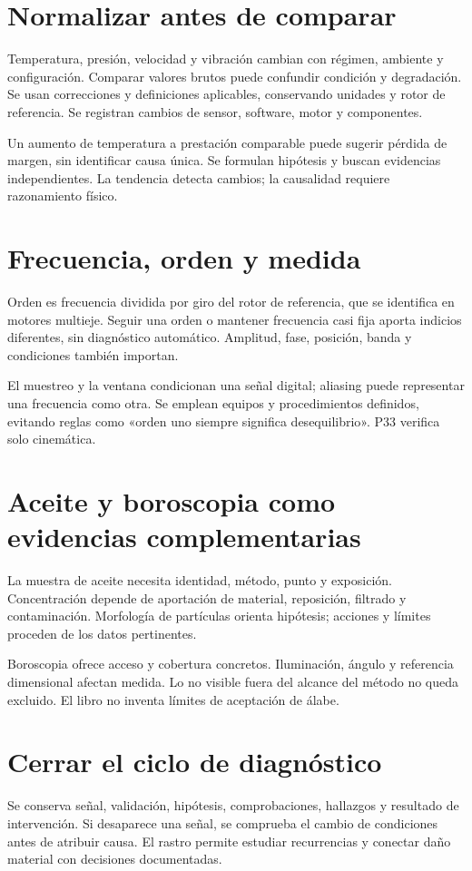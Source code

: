 
\section{Normalizar antes de comparar}
Temperatura, presión, velocidad y vibración cambian con régimen, ambiente y configuración. Comparar valores brutos puede confundir condición y degradación. Se usan correcciones y definiciones aplicables, conservando unidades y rotor de referencia. Se registran cambios de sensor, software, motor y componentes.

Un aumento de temperatura a prestación comparable puede sugerir pérdida de margen, sin identificar causa única. Se formulan hipótesis y buscan evidencias independientes. La tendencia detecta cambios; la causalidad requiere razonamiento físico.
\section{Frecuencia, orden y medida}
Orden es frecuencia dividida por giro del rotor de referencia, que se identifica en motores multieje. Seguir una orden o mantener frecuencia casi fija aporta indicios diferentes, sin diagnóstico automático. Amplitud, fase, posición, banda y condiciones también importan.

El muestreo y la ventana condicionan una señal digital; aliasing puede representar una frecuencia como otra. Se emplean equipos y procedimientos definidos, evitando reglas como «orden uno siempre significa desequilibrio». P33 verifica solo cinemática.
\section{Aceite y boroscopia como evidencias complementarias}
La muestra de aceite necesita identidad, método, punto y exposición. Concentración depende de aportación de material, reposición, filtrado y contaminación. Morfología de partículas orienta hipótesis; acciones y límites proceden de los datos pertinentes.

Boroscopia ofrece acceso y cobertura concretos. Iluminación, ángulo y referencia dimensional afectan medida. Lo no visible fuera del alcance del método no queda excluido. El libro no inventa límites de aceptación de álabe.
\section{Cerrar el ciclo de diagnóstico}
Se conserva señal, validación, hipótesis, comprobaciones, hallazgos y resultado de intervención. Si desaparece una señal, se comprueba el cambio de condiciones antes de atribuir causa. El rastro permite estudiar recurrencias y conectar daño material con decisiones documentadas.
